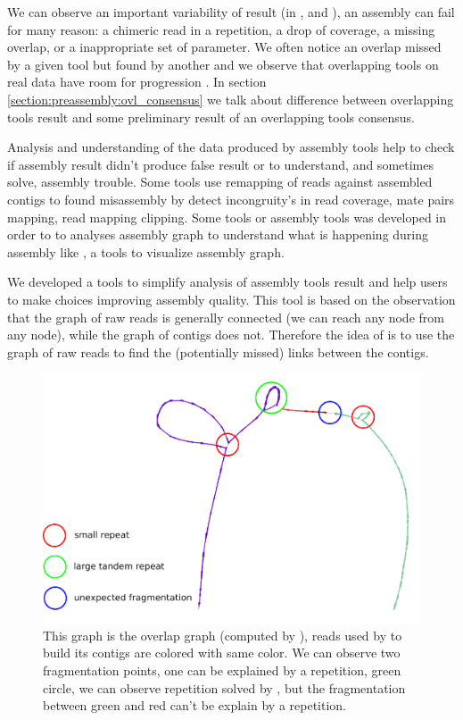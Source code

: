 \documentclass[main.tex]{subfiles}
\begin{document}
We can observe an important variability of result (in \canu, \wtdbg and ), an assembly can fail for many reason: a chimeric read in a repetition, a drop of coverage, a missing overlap, or a inappropriate  set of parameter.
We often notice an overlap missed by a given tool but found by another and we observe that overlapping tools on real data have room for progression  \cite{ovl_bench}. 
In section \ref{section:preassembly:ovl_consensus} we talk about difference between overlapping tools result and some preliminary result of an overlapping tools consensus.%

Analysis and understanding of the data produced by assembly tools help to check if assembly result didn't produce false result or to understand, and sometimes solve, assembly trouble. Some tools use remapping of reads against assembled contigs to found misassembly by detect incongruity's in read coverage, mate pairs mapping, read mapping clipping.
Some tools or assembly tools was developed in order to to analyses assembly graph to understand what is happening during assembly like  \cite{bandage}, a tools to visualize assembly graph.

We developed \knot a tools to simplify analysis of assembly tools result and help users to make choices improving assembly quality.%
This tool is based on the observation that the graph of raw reads is generally connected (we can reach any node from any node), while the graph of contigs does not. Therefore the idea of \knot is to use the graph of raw reads to find the (potentially missed) links between the contigs.

\begin{figure}[ht]
    \includegraphics[width=\textwidth]{postassembly/images/t_roseus_projection_annoted.pdf}
    \caption{This graph is the overlap graph (computed by \minimap), reads used by \canu to build its contigs are colored with same color. We can observe two fragmentation points, one can be explained by a repetition, green circle, we can observe repetition solved by \canu, but the fragmentation between green and red can't be explain by a repetition.}%
    \label{postassembly:fig:t_roseus_example}
\end{figure}
\end{document}
